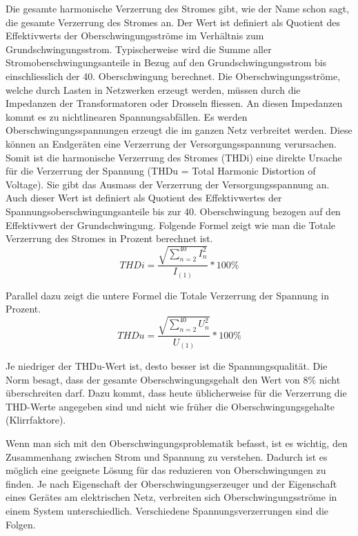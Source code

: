 Die gesamte harmonische Verzerrung des Stromes gibt, wie der Name schon sagt, die gesamte Verzerrung des Stromes an. Der Wert ist definiert als Quotient des Effektivwerts der Oberschwingungsströme im Verhältnis zum Grundschwingungsstrom. Typischerweise wird die Summe aller Stromoberschwingungsanteile in Bezug auf den Grundschwingungsstrom bis einschliesslich der 40. Oberschwingung berechnet. Die Oberschwingungsströme, welche durch Lasten in Netzwerken erzeugt werden, müssen durch die Impedanzen der Transformatoren oder Drosseln fliessen. An diesen Impedanzen kommt es zu nichtlinearen Spannungsabfällen. Es werden Oberschwingungsspannungen erzeugt die im ganzen Netz verbreitet werden. Diese können an Endgeräten eine Verzerrung der Versorgungsspannung verursachen. Somit ist die harmonische Verzerrung des Stromes (THDi) eine direkte Ursache für die Verzerrung der Spannung (THDu = Total Harmonic Distortion of Voltage). Sie gibt das Ausmass der Verzerrung der Versorgungsspannung an. Auch dieser Wert ist definiert als Quotient des Effektivwertes der Spannungsoberschwingungsanteile bis zur 40. Oberschwingung bezogen auf den Effektivwert der Grundschwingung. 
Folgende Formel zeigt wie man die Totale Verzerrung des Stromes in Prozent berechnet ist.
\begin{equation}\label{eq:THDi}
THDi = \frac{\sqrt{\sum_{n=2}^{40} I_n^2}}{I_{(1)}} * 100 \%
\end{equation}

Parallel dazu zeigt die untere Formel die Totale Verzerrung der Spannung in Prozent.
\begin{equation}\label{eq:THDu}
	THDu = \frac{\sqrt{\sum_{n=2}^{40} U_n^2}}{U_{(1)}} * 100\%
\end{equation}






Je niedriger der THDu-Wert ist, desto besser ist die Spannungsqualität. Die Norm besagt, dass der gesamte Oberschwingungsgehalt den Wert von 8\% nicht überschreiten darf. Dazu kommt, dass heute üblicherweise für die Verzerrung die THD-Werte angegeben sind und nicht wie früher die Oberschwingungsgehalte (Klirrfaktore).

Wenn man sich mit den Oberschwingungsproblematik befasst, ist es wichtig, den Zusammenhang zwischen Strom und Spannung zu verstehen. Dadurch ist es möglich eine geeignete Lösung für das reduzieren von Oberschwingungen zu finden. 
Je nach Eigenschaft der Oberschwingungserzeuger und der Eigenschaft eines Gerätes am elektrischen Netz, verbreiten sich Oberschwingungsströme in einem System unterschiedlich. Verschiedene Spannungsverzerrungen sind die Folgen. 


